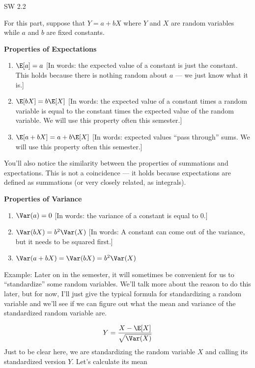 \documentclass[
  letterpaper,
  DIV=11,
  numbers=noendperiod]{scrreprt}
\begin{document}
SW 2.2

For this part, suppose that \(Y=a + bX\) where \(Y\) and \(X\) are
random variables while \(a\) and \(b\) are fixed constants.

\textbf{Properties of Expectations}

\begin{enumerate}
\def\labelenumi{\arabic{enumi}.}
\item
  \(\E[a] = a\) {[}In words: the expected value of a constant is just
  the constant. This holds because there is nothing random about \(a\)
  --- we just know what it is.{]}
\item
  \(\E[bX] = b\E[X]\) {[}In words: the expected value of a constant
  times a random variable is equal to the constant times the expected
  value of the random variable. We will use this property often this
  semester.{]}
\item
  \(\E[a + bX] = a + b\E[X]\) {[}In words: expected values ``pass
  through'' sums. We will use this property often this semester.{]}
\end{enumerate}

You'll also notice the similarity between the properties of summations
and expectations. This is not a coincidence --- it holds because
expectations are defined as summations (or very closely related, as
integrals).

\textbf{Properties of Variance}

\begin{enumerate}
\def\labelenumi{\arabic{enumi}.}
\item
  \(\Var(a) = 0\) {[}In words: the variance of a constant is equal to
  0.{]}
\item
  \(\Var(bX) = b^2 \Var(X)\) {[}In words: A constant can come out of the
  variance, but it needs to be squared first.{]}
\item
  \(\Var(a + bX) = \Var(bX) = b^2 \Var(X)\)
\end{enumerate}

{Example: }Later on in the semester, it will sometimes be convenient for
us to ``standardize'' some random variables. We'll talk more about the
reason to do this later, but for now, I'll just give the typical formula
for standardizing a random variable and we'll see if we can figure out
what the mean and variance of the standardized random variable are.

\[
  Y = \frac{ X - \E[X]}{\sqrt{\Var(X)}}
\] Just to be clear here, we are standardizing the random variable \(X\)
and calling its standardized version \(Y\). Let's calculate its mean
\end{document}
